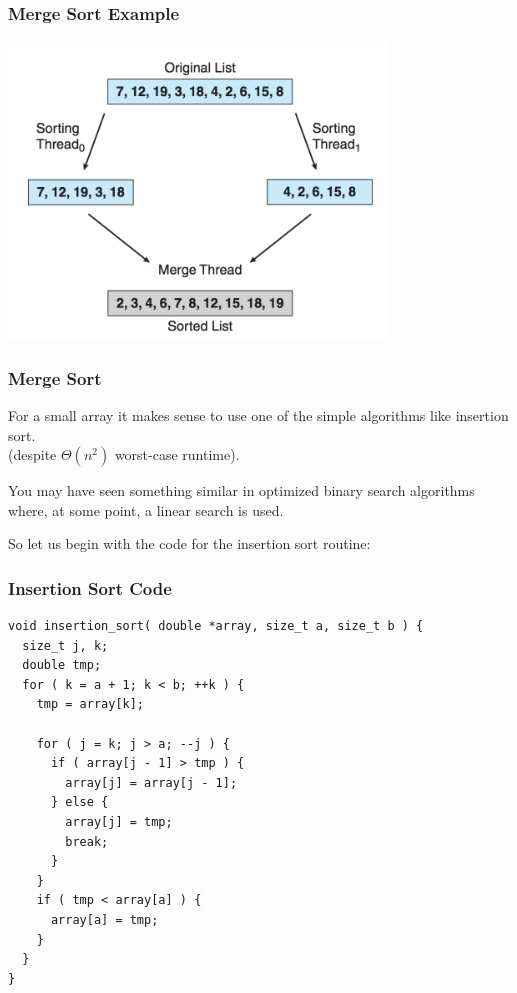  
\begin{frame}
\frametitle{Merge Sort Example}

\begin{center}
	\includegraphics[width=0.75\textwidth]{images/multithread-sort.png}
\end{center}


\end{frame}
 
\begin{frame}
\frametitle{Merge Sort}

For a small array it makes sense to use one of the simple algorithms like insertion sort.\\
\quad  (despite $\Theta(n^{2})$ worst-case runtime). 

You may have seen something similar in optimized binary search algorithms where, at some point, a linear search is used. 

So let us begin with the code for the insertion sort routine:

\end{frame}
 
\begin{frame}[fragile]
\frametitle{Insertion Sort Code}

\begin{verbatim}
void insertion_sort( double *array, size_t a, size_t b ) {
  size_t j, k;
  double tmp;
  for ( k = a + 1; k < b; ++k ) { 
    tmp = array[k];
    
    for ( j = k; j > a; --j ) {
      if ( array[j - 1] > tmp ) {
        array[j] = array[j - 1];
      } else {
        array[j] = tmp;
        break;
      }
    }
    if ( tmp < array[a] ) {
      array[a] = tmp;
    }
  } 
}
\end{verbatim}

\end{frame}
 

